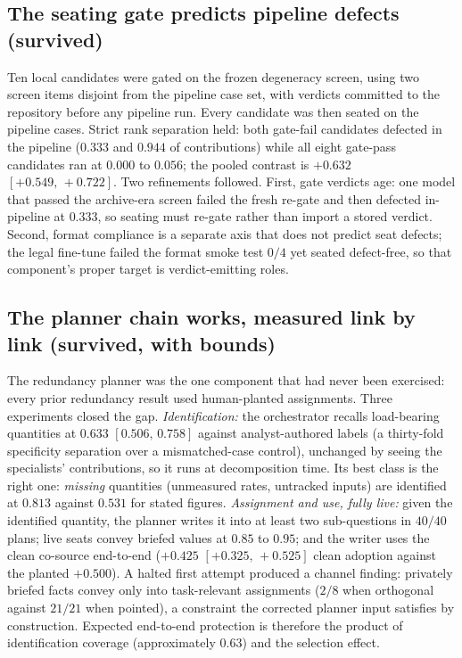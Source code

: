 \documentclass[11pt]{article}
\newcommand{\ci}[2]{\ensuremath{[#1,\,#2]}}
\begin{document}
\subsection{The seating gate predicts pipeline defects (survived)}

Ten local candidates were gated on the frozen degeneracy screen, using
two screen items disjoint from the pipeline case set, with verdicts
committed to the repository before any pipeline run. Every candidate
was then seated on the pipeline cases. Strict rank separation held:
both gate-fail candidates defected in the pipeline ($0.333$ and $0.944$
of contributions) while all eight gate-pass candidates ran at $0.000$
to $0.056$; the pooled contrast is $+0.632$ \ci{+0.549}{+0.722}. Two
refinements followed. First, gate verdicts age: one model that passed
the archive-era screen failed the fresh re-gate and then defected
in-pipeline at $0.333$, so seating must re-gate rather than import a
stored verdict. Second, format compliance is a separate axis that does
not predict seat defects; the legal fine-tune failed the format smoke
test $0/4$ yet seated defect-free, so that component's proper target is
verdict-emitting roles.

\subsection{The planner chain works, measured link by link (survived,
with bounds)}

The redundancy planner was the one component that had never been
exercised: every prior redundancy result used human-planted
assignments. Three experiments closed the gap. \emph{Identification:}
the orchestrator recalls load-bearing quantities at $0.633$
\ci{0.506}{0.758} against analyst-authored labels (a thirty-fold
specificity separation over a mismatched-case control), unchanged by
seeing the specialists' contributions, so it runs at decomposition
time. Its best class is the right one: \emph{missing} quantities
(unmeasured rates, untracked inputs) are identified at $0.813$ against
$0.531$ for stated figures. \emph{Assignment and use, fully live:}
given the identified quantity, the planner writes it into at least two
sub-questions in $40/40$ plans; live seats convey briefed values at
$0.85$ to $0.95$; and the writer uses the clean co-source end-to-end
($+0.425$ \ci{+0.325}{+0.525} clean adoption against the planted
$+0.500$). A halted first attempt produced a channel finding: privately
briefed facts convey only into task-relevant assignments ($2/8$ when
orthogonal against $21/21$ when pointed), a constraint the corrected
planner input satisfies by construction. Expected end-to-end protection
is therefore the product of identification coverage (approximately
$0.63$) and the selection effect.
\end{document}
